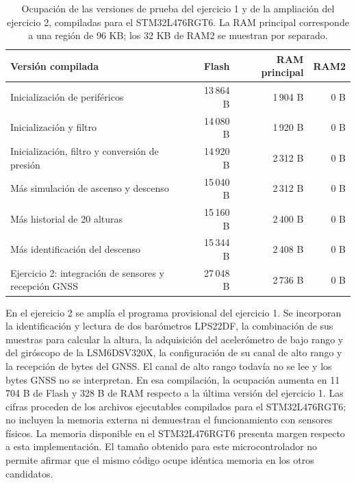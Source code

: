 \documentclass[11pt,a4paper]{article}
\begin{document}
\begin{table}[H]
    \centering
    \renewcommand{\arraystretch}{1.2}
    \begin{tabular}{p{7.5cm}rrr}
        \toprule
        Versión compilada & Flash & RAM principal & RAM2 \\
        \midrule
        Inicialización de periféricos
            & 13\,864 B & 1\,904 B & 0 B \\
        Inicialización y filtro
            & 14\,080 B & 1\,920 B & 0 B \\
        Inicialización, filtro y conversión de presión
            & 14\,920 B & 2\,312 B & 0 B \\
        Más simulación de ascenso y descenso
            & 15\,040 B & 2\,312 B & 0 B \\
        Más historial de 20 alturas
            & 15\,160 B & 2\,400 B & 0 B \\
        Más identificación del descenso
            & 15\,344 B & 2\,408 B & 0 B \\
        Ejercicio 2: integración de sensores y recepción GNSS
            & 27\,048 B & 2\,736 B & 0 B \\
        \bottomrule
    \end{tabular}
    \caption{Ocupación de las versiones de prueba del ejercicio 1 y de la
    ampliación del ejercicio 2, compiladas para el STM32L476RGT6. La RAM principal
    corresponde a una región de 96 KB\@; los 32 KB de RAM2 se muestran
    por separado.}%
    \label{tab:ocupacion_flash_prueba}
\end{table}

En el ejercicio 2 se amplía el programa provisional del ejercicio 1. Se
incorporan la identificación y lectura de dos barómetros LPS22DF, la
combinación de sus muestras para calcular la altura, la adquisición del
acelerómetro de bajo rango y del giróscopo de la LSM6DSV320X, la
configuración de su canal de alto rango y la recepción de bytes del GNSS.
El canal de alto rango todavía no se lee y los bytes GNSS no se interpretan.
En esa compilación, la ocupación aumenta en 11\,704 B de Flash y 328 B de RAM
respecto a la última versión del ejercicio 1. Las cifras proceden de los
archivos ejecutables compilados para el STM32L476RGT6; no incluyen la memoria
externa ni demuestran el funcionamiento con sensores físicos.
La memoria disponible en el STM32L476RGT6 presenta margen respecto a esta
implementación. El tamaño obtenido para este microcontrolador no permite
afirmar que el mismo código ocupe idéntica memoria en los otros candidatos.
\end{document}
